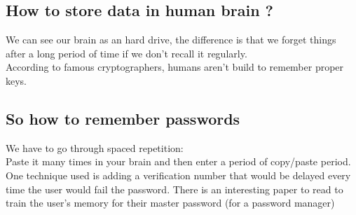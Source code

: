 \documentclass[10pt,a4paper]{article}
\begin{document}
\subsection{How to store data in human brain ?}
We can see our brain as an hard drive, the difference is that we forget things after a long period of time if we don't recall it regularly.\\
According to famous cryptographers, humans aren't build to remember proper keys.\\
\subsection{So how to remember passwords}
We have to go through spaced repetition:\\
Paste it many times in your brain and then enter a period of copy/paste period.\\
One technique used is adding a verification number that would be delayed every time the user would fail the password. There is an interesting paper to read to train the user's memory for their master password (for a password manager)
\end{document}
